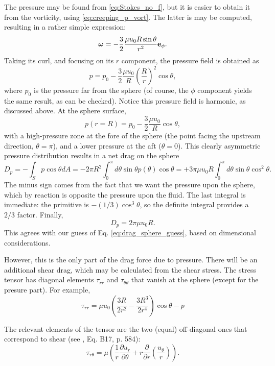 The pressure may be found from \ref{eq:Stokes_no_f}, but
it is easier to obtain it from the vorticity, using
\ref{eq:creeping_p_vort}. The latter is may be computed,
resulting in a rather simple expression:
\[
\bm{\omega} = 
- \frac32 \frac{\mu u_0 R \sin\theta }{r^2} \mathbf{e}_\phi .
\]
Taking its curl, and focusing on its $r$ component, the pressure
field is obtained as
\[
  p=p_0 - \frac32 \frac{\mu u_0}{R} \left(\frac{R}{r}\right)^2
  \cos\theta ,
\]
where $p_0$ is the pressure far from the sphere (of course, the
$\phi$ component yields the same result, as can be checked). Notice
this pressure field is harmonic, as discussed above. At the sphere surface,
\[
  p(r=R) = p_0 - \frac32 \frac{\mu u_0}{R} \cos\theta,
\]
with a high-pressure zone at the fore of the sphere (the point facing
the upstream direction, $\theta=\pi$), and a lower pressure at the aft
($\theta=0$). This clearly asymmetric pressure distribution results in
a net drag on the sphere
\[
  D_p=  - \int_S  p \cos\theta dA =
  -2\pi R^2 \int_0^\pi d\theta \sin\theta  p(\theta) \cos\theta =
  + 3 \pi \mu u_0 R \int_0^\pi d\theta \sin\theta  \cos^2\theta .
\]
The minus sign comes from the fact that we want the pressure upon the
sphere, which by reaction is opposite the pressure upon the fluid.
The last integral is immediate: the primitive is $-(1/3)\cos^3\theta$,
so the definite integral provides a $2/3$ factor. Finally,
\[
  D_p=  2 \pi \mu u_0 R .
\]
This agrees with our guess of Eq. \ref{eq:drag_sphere_guess}, based on
dimensional considerations.

However, this is the only part of the drag force due to pressure. There will be an
additional shear drag, which may be calculated from the shear stress.
The stress tensor has diagonal elements $\tau_{rr}$ and
$\tau_{\theta\theta}$ that vanish at the sphere (except for
the presure part). For example,
\begin{equation*}
\tau_{rr} = \mu u_0
\left(
\frac{3R}{2 r^2} -
\frac{3R^3}{2 r^4}
\right)
\cos\theta - p
\end{equation*}



The relevant elements of the tensor are the two (equal) off-diagonal ones that
correspond to shear (see \cite{white1991viscous},
Eq. B17, p. 584):
\begin{equation}
  \label{eq:tau_r_th}
  \tau_{r\theta} = \mu \left(
    \frac1r
    \frac{\partial u_r}{\partial \theta} +
    r \frac{\partial }{\partial r} \left( \frac{u_\theta}{r}\right) 
  \right) .
\end{equation}

